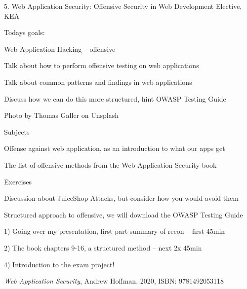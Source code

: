 \documentclass[Screen16to9,17pt]{foils}
\begin{document}
\mytitlepage
{5. Web Application Security: Offensive}
{Security in Web Development Elective, KEA}




Todays goals:
\begin{list2}
\item Web Application Hacking -- offensive
\item Talk about how to perform offensive testing on web applications
\item Talk about common patterns and findings in web applications
\item Discuss how we can do this more structured, hint OWASP Testing Guide
\end{list2}

Photo by Thomas Galler on Unsplash




\begin{list1}
\item Subjects
\begin{list2}
\item Offense against web application, as an introduction to what our apps get
\item The list of offensive methods from the Web Application Security book
\end{list2}
\item Exercises
\begin{list2}
\item Discussion about JuiceShop Attacks, but consider how you would avoid them
\end{list2}
\end{list1}


\begin{list2}
\item Structured approach to offensive, we will download the OWASP Testing Guide
\item 1) Going over my presentation, first part summary of recon -- first 45min
\item 2) The book chapters 9-16, a structured method -- next 2x 45min
\item 4) Introduction to the exam project!
\end{list2}



\emph{Web Application Security}, Andrew Hoffman, 2020, ISBN: 9781492053118
\end{document}
